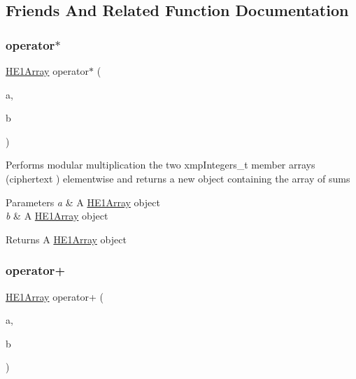 \subsection{Friends And Related Function Documentation}
\mbox{\label{classHE1Array_a9af458afd1fae2464406a71868d411d9}} 
\subsubsection{\texorpdfstring{operator$\ast$}{operator*}}
{\footnotesize\ttfamily \hyperlink{classHE1Array}{H\+E1\+Array} operator$\ast$ (\begin{DoxyParamCaption}\item[{\hyperlink{classHE1Array}{H\+E1\+Array} \&}]{a,  }\item[{\hyperlink{classHE1Array}{H\+E1\+Array} \&}]{b }\end{DoxyParamCaption})\hspace{0.3cm}{\ttfamily [friend]}}

Performs modular multiplication the two {\ttfamily xmp\+Integers\+\_\+t} member arrays ({\ttfamily ciphertext} ) elementwise and returns a new object containing the array of sums 
\begin{DoxyParams}{Parameters}
{\em a} & A {\ttfamily \hyperlink{classHE1Array}{H\+E1\+Array}} object \\
\hline
{\em b} & A {\ttfamily \hyperlink{classHE1Array}{H\+E1\+Array}} object \\
\hline
\end{DoxyParams}
\begin{DoxyReturn}{Returns}
A {\ttfamily \hyperlink{classHE1Array}{H\+E1\+Array}} object 
\end{DoxyReturn}
\mbox{\label{classHE1Array_aaa51e336d1bca00b78a39445cc9525ec}} 
\subsubsection{\texorpdfstring{operator+}{operator+}}
{\footnotesize\ttfamily \hyperlink{classHE1Array}{H\+E1\+Array} operator+ (\begin{DoxyParamCaption}\item[{\hyperlink{classHE1Array}{H\+E1\+Array} \&}]{a,  }\item[{\hyperlink{classHE1Array}{H\+E1\+Array} \&}]{b }\end{DoxyParamCaption})\hspace{0.3cm}{\ttfamily [friend]}}

